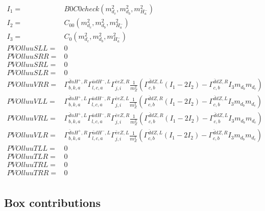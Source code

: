 \documentclass[A4,landscape]{article}
\begin{document}
\begin{align} 
I_1= & B0C0check(m^2_{d_{{c}}}, m^2_{d_{{b}}}, m^2_{H^-_{{a}}}) \\ 
I_2= & C_{00}(m^2_{d_{{c}}}, m^2_{d_{{b}}}, m^2_{H^-_{{a}}}) \\ 
I_3= & C_0(m^2_{d_{{c}}}, m^2_{d_{{b}}}, m^2_{H^-_{{a}}}) \\ 
  PVOlluuSLL= & 0 \\ 
  PVOlluuSRR= & 0 \\ 
  PVOlluuSRL= & 0 \\ 
  PVOlluuSLR= & 0 \\ 
  PVOlluuVRR= &  \Gamma^{\bar{d}u H^+,R}_{b, k, a} \Gamma^{\bar{u}d H^- ,L}_{l, c, a} \Gamma^{\bar{e}e Z ,R}_{j, i} \frac{1}{m^2_{Z}} (\Gamma^{\bar{d}d Z ,L}_{c, b} (I_1 - 2 I_2) - \Gamma^{\bar{d}d Z ,R}_{c, b} I_3 m_{d_{{b}}} m_{d_{{c}}}) \\ 
  PVOlluuVLL= &  \Gamma^{\bar{d}u H^+,L}_{b, k, a} \Gamma^{\bar{u}d H^- ,R}_{l, c, a} \Gamma^{\bar{e}e Z ,L}_{j, i} \frac{1}{m^2_{Z}} (\Gamma^{\bar{d}d Z ,R}_{c, b} (I_1 - 2 I_2) - \Gamma^{\bar{d}d Z ,L}_{c, b} I_3 m_{d_{{b}}} m_{d_{{c}}}) \\ 
  PVOlluuVRL= &  \Gamma^{\bar{d}u H^+,L}_{b, k, a} \Gamma^{\bar{u}d H^- ,R}_{l, c, a} \Gamma^{\bar{e}e Z ,R}_{j, i} \frac{1}{m^2_{Z}} (\Gamma^{\bar{d}d Z ,R}_{c, b} (I_1 - 2 I_2) - \Gamma^{\bar{d}d Z ,L}_{c, b} I_3 m_{d_{{b}}} m_{d_{{c}}}) \\ 
  PVOlluuVLR= &  \Gamma^{\bar{d}u H^+,R}_{b, k, a} \Gamma^{\bar{u}d H^- ,L}_{l, c, a} \Gamma^{\bar{e}e Z ,L}_{j, i} \frac{1}{m^2_{Z}} (\Gamma^{\bar{d}d Z ,L}_{c, b} (I_1 - 2 I_2) - \Gamma^{\bar{d}d Z ,R}_{c, b} I_3 m_{d_{{b}}} m_{d_{{c}}}) \\ 
  PVOlluuTLL= & 0 \\ 
  PVOlluuTLR= & 0 \\ 
  PVOlluuTRL= & 0 \\ 
  PVOlluuTRR= & 0 \\ 
\end{align} 
\subsection{Box contributions} 
\end{document}
